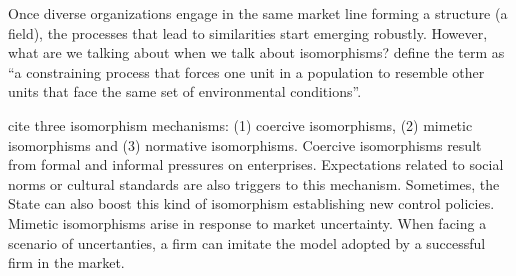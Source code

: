 \documentclass[a4paper, 12pt, openright, oneside, german, french, brazil, english]{abntex2}
\begin{document}
	
	
	Once diverse organizations engage in the same market line forming a structure (a field), the processes that lead to similarities start emerging robustly. However, what are we talking about when we talk about isomorphisms?  define the term as ``a constraining process that forces one unit in a population to resemble other units that face the same set of environmental conditions''.
	
	
	 cite three isomorphism mechanisms: (1) coercive isomorphisms, (2) mimetic isomorphisms and (3) normative isomorphisms. Coercive isomorphisms result from formal and informal pressures on enterprises. Expectations related to social norms or cultural standards are also triggers to this mechanism. Sometimes, the State can also boost this kind of isomorphism establishing new control policies. Mimetic isomorphisms arise in response to market uncertainty. When facing a scenario of uncertanties, a firm can imitate the model adopted by a successful firm in the market. 
	
	
\end{document}
